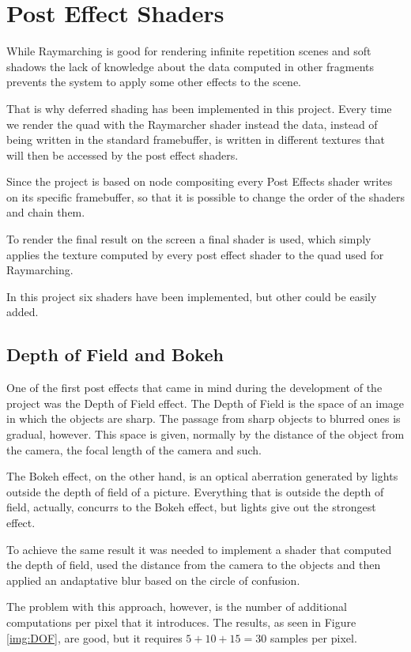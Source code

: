 \chapter{Post Effect Shaders \label{chap:postfx} }

While Raymarching is good for rendering infinite repetition scenes and soft shadows
the lack of knowledge about the data computed in other fragments prevents 
the system to apply some other effects to the scene.

That is why deferred shading has been implemented in this project. Every time we
render the quad with the Raymarcher shader instead the data, instead of being written in the standard
framebuffer, is written in different textures that will then be accessed by
the post effect shaders.

Since the project is based on node compositing every Post Effects shader writes
on its specific framebuffer, so that it is possible to change the order of the shaders
and chain them.

To render the final result on the screen a final shader is used, which simply
applies the texture computed by every post effect shader to the quad used for
Raymarching.

In this project six shaders have been implemented, but other could be easily
added. 

\section{Depth of Field and Bokeh}

One of the first post effects that came in mind during the development of the
project was the Depth of Field effect. The Depth of Field is the space of an image
in which the objects are sharp. The passage from sharp objects to blurred ones
is gradual, however. This space is given, normally by the distance of the object
from the camera, the focal length of the camera and such.

The Bokeh effect, on the other hand, is an optical aberration generated by
lights outside the depth of field of a picture. Everything that is outside the
depth of field, actually, concurrs to the Bokeh effect, but lights give out
the strongest effect. 

To achieve the same result it was needed to implement a shader that computed the depth
of field, used the distance from the camera to the objects and then applied
an andaptative blur based on the circle of confusion.

The problem with this approach, however, is the number of additional computations
per pixel that it introduces. The results, as seen in Figure \ref{img:DOF}, are
good, but it requires $5 + 10 + 15 = 30$ samples per pixel.

